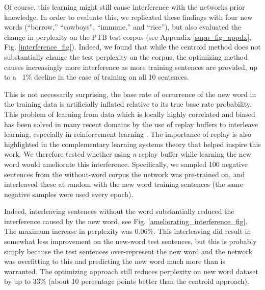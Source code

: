 \documentclass{article}
\begin{document}
Of course, this learning might still cause interference with the networks prior knowledge. In order to evaluate this, we replicated these findings with four new words (``borrow,'' ``cowboys'', ``immune,'' and ``rice''), but also evaluated the change in perplexity on the PTB test corpus (see Appendix \ref{supp_fig_appdx}, Fig. \ref{interference_fig}). Indeed, we found that while the centroid method does not substantially change the test perplexity on the corpus, the optimizing method causes increasingly more interference as more training sentences are provided, up to a ~1\% decline in the case of training on all 10 sentences. \par
This is not necessarily surprising, the base rate of occurrence of the new word in the training data is artificially inflated relative to its true base rate probability. This problem of learning from data which is locally highly correlated and biased has been solved in many recent domains by the use of replay buffers to interleave learning, especially in reinforcement learning \citep[e.g]{Mnih2015}. The importance of replay is also highlighted in the complementary learning systems theory \citep{Kumaran2016} that helped inspire this work. We therefore tested whether using a replay buffer while learning the new word would ameliorate this interference. Specifically, we sampled 100 negative sentences from the without-word corpus the network was pre-trained on, and interleaved these at random with the new word training sentences (the same negative samples were used every epoch). \par
Indeed, interleaving sentences without the word substantially reduced the interference caused by the new word, see Fig. \ref{ameliorating_interference_fig}. The maximum increase in perplexity was \(0.06\%\). This interleaving did result in somewhat less improvement on the new-word test sentences, but this is probably simply because the test sentences over-represent the new word and the network was overfitting to this and predicting the new word much more than is warranted. The optimizing approach still reduces perplexity on new word dataset by up to 33\% (about 10 percentage points better than the centroid approach). \par
\end{document}
